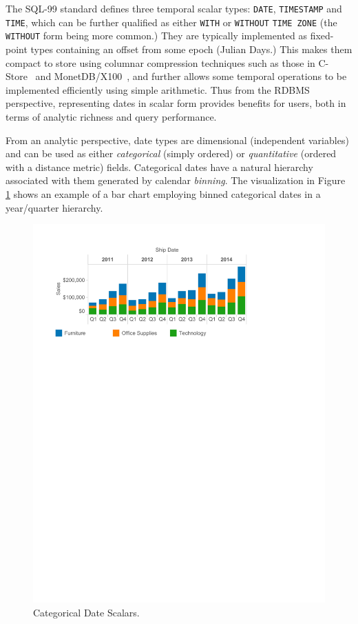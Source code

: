 The SQL-99 standard defines three temporal scalar types: \texttt{DATE}, \texttt{TIMESTAMP} and \texttt{TIME}, which can be further qualified as either \texttt{WITH} or \texttt{WITHOUT} \texttt{TIME ZONE} (the \texttt{WITHOUT} form being more common.) They are typically implemented as fixed-point types containing an offset from some epoch (\eg Julian Days.) This makes them compact to store using columnar compression techniques such as those in C-Store~\cite{Stonebraker:2005} and MonetDB/X100~\cite{Zukowski:2006}, and further allows some temporal operations to be implemented efficiently using simple arithmetic. 
Thus from the RDBMS perspective, representing dates in scalar form provides benefits for users, both in terms of analytic richness and query performance.

From an analytic perspective, date types are dimensional (\ie independent variables) and can be used as either \textit{categorical} (simply ordered) or \textit{quantitative} (ordered with a distance metric) fields.
Categorical dates have a natural hierarchy associated with them generated by calendar \textit{binning}. The visualization in Figure \ref{fig:I1} shows an example of a bar chart employing binned categorical dates in a year/quarter hierarchy.

\begin{figure}[ht]
\centering
\includegraphics[width=\columnwidth]{figures/FigureI1}
\caption{Categorical Date Scalars.}
\label{fig:I1}
\end{figure}

